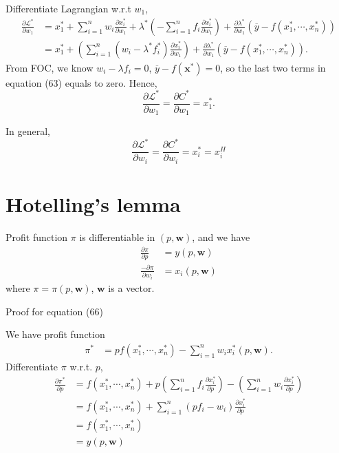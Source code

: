 \documentclass[12pt]{article}
\begin{document}
Differentiate Lagrangian w.r.t $ w_1 $,
\begin{align}
				\frac{\partial \mathscr{L}^{*} }{\partial w_1 } &= 
				x_1^{*} + \sum\limits_{i = 1} ^n w_{i}\frac{\partial x_{i}^{*} }
				{\partial w_1 }	 + \lambda ^{*}\left( 
				-\sum\limits_{i = 1} ^n f_{i}\frac{\partial x_{i}^{*} }
        {\partial w_{1} }	\right)  + \frac{\partial \lambda ^{*} }
				{\partial w_1 }(\overline{y} - f(x_1^{*}, \cdots, x_{n}^{*}))\\
				&= x_1^{*} + \left(\sum\limits_{i = 1} ^n (w_{i} -
				\lambda ^{*}f^{*}_{i})\frac{\partial x_{i}^{*} }{\partial w_1 }\right)
				+ \frac{\partial \lambda ^{*} }{\partial w_1 }(\overline{y} - 
				f(x_1^{*},\cdots,x_{n}^{*})).
\end{align}
From FOC, we know $ w_{i} - \lambda f_{i} = 0 $, $ \overline{y} - f(\bm{x}^{*})
=0$, so the last two terms in equation (63) equals to zero.
Hence, 
\begin{equation}
				\frac{\partial \mathscr{L}^{*} }{\partial w_1 } = 
				\frac{\partial C^{*} }{\partial w_1 } = x_1^{*}.
\end{equation}


In general, 
\begin{equation}
				\frac{\partial \mathscr{L}^{*} }{\partial w_{i} } =
				\frac{\partial C^{*} }{\partial w_{i} } = x_{i}^{*} = x_{i}^{H}
\end{equation}




\section{Hotelling's lemma}

Profit function $ \pi  $ is differentiable in $ (p, \bm{w}) $, and we have
\begin{align}
				\frac{\partial \pi  }{\partial p } &= y(p, \bm{w})\\
				\frac{-\partial \pi  }{\partial w_{i} } &= x_{i}(p, \bm{w})
\end{align}
where $ \pi  = \pi (p,\bm{w}) $, $ \bm{w} $ is a vector.

Proof for equation (66)

We have profit function 
\begin{align}
				\pi ^{*} &= pf(x_1^{*},\cdots, x_{n}^{*}) - \sum\limits_{i = 1} ^n
				w_{i}x_{i}^{*}(p, \bm{w}).
\end{align}
Differentiate $ \pi  $ w.r.t. $ p $,
\begin{align}
				\frac{\partial \pi ^{*} }{\partial p } &= 
				f(x_1^{*},\cdots,x_{n}^{*}) + p \left( 
				\sum\limits_{i = 1} ^n f_{i} \frac{\partial x_{i}^{*} }{\partial p }
        \right)  - \left( 
        \sum\limits_{i = 1} ^n w_{i}\frac{\partial x_{i}^{*} }{\partial p }
        \right)\\
				 &= f(x_1^{*},\cdots,x_{n}^{*}) + \sum\limits_{i = 1} ^n
				 (pf_{i} - w_i)\frac{\partial x_{i}^{*} }{\partial p }\\
				 &= f(x_1^{*},\cdots,x_{n}^{*})\\
				 &= y(p, \bm{w})
\end{align}
\end{document}
